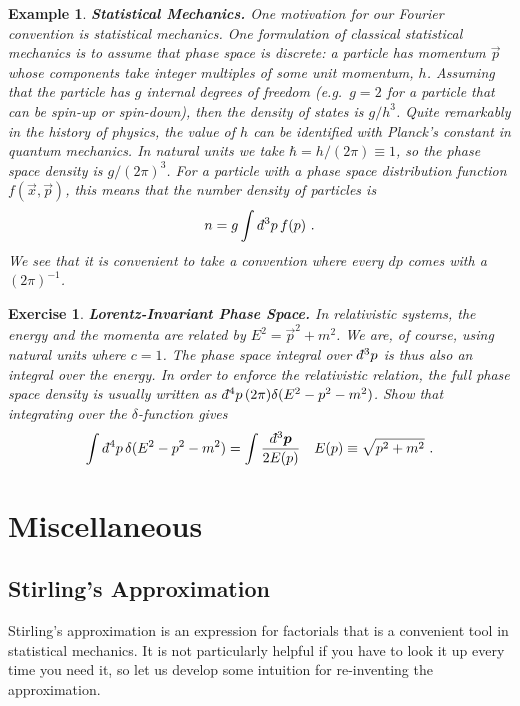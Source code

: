 \documentclass[
  11pt,
	colorful,
	raggedright,
]{tufte-style-thesis-flip}
\newtheorem{exercise}{Exercise}[section]
\newtheorem{example}{Example}[section]
\renewcommand{\dbar}{d\hspace*{-0.08em}\bar{}\hspace*{0.1em}}
\begin{document}
\begin{example}
\textbf{Statistical Mechanics.} One motivation for our Fourier convention is statistical mechanics. One formulation of classical statistical mechanics is to assume that phase space is discrete: a particle has momentum $\vec{p}$ whose components take integer multiples of some unit momentum, $h$. Assuming that the particle has $g$ internal degrees of freedom (e.g.~$g=2$ for a particle that can be spin-up or spin-down), then the density of states is $g/h^{3}$. Quite remarkably in the history of physics, the value of $h$ can be identified with Planck's constant in quantum mechanics. In natural units we take $\hbar = h/(2\pi)\equiv 1$, so the phase space density is $g/(2\pi)^3$. For a particle with a phase space distribution function $f(\vec{x},\vec{p})$, this means that the number density of particles is
\begin{align}
  n = g\int \dbar^3p \, f(p) \ .
\end{align}
We see that it is convenient to take a convention where every $dp$ comes with a $(2\pi)^{-1}$.
\end{example}

\begin{exercise}\textbf{Lorentz-Invariant Phase Space.}
In relativistic systems, the energy and the momenta are related by $E^2 = \vec{p}^2 + m^2$. We are, of course, using natural units where $c=1$. The phase space integral over $\dbar^3p$ is thus also an integral over the energy. In order to enforce the relativistic relation, the full phase space density is usually written as $\dbar^4p\, (2\pi)\delta(E^2-p^2-m^2)$. Show that integrating over the $\delta$-function gives
\begin{align}
  \int \dbar^4p\, \delta(E^2-p^2-m^2) &= 
  \int \frac{\dbar^3\vec{p}}{2E(p)}
  &
  E(p) \equiv \sqrt{p^2 + m^2} \ .
\end{align}
\end{exercise}




\chapter{Miscellaneous}

\section{Stirling's Approximation}

Stirling's approximation is an expression for factorials that is a convenient tool in statistical mechanics. It is not particularly helpful if you have to look it up every time you need it, so let us develop some intuition for re-inventing the approximation.
\end{document}
